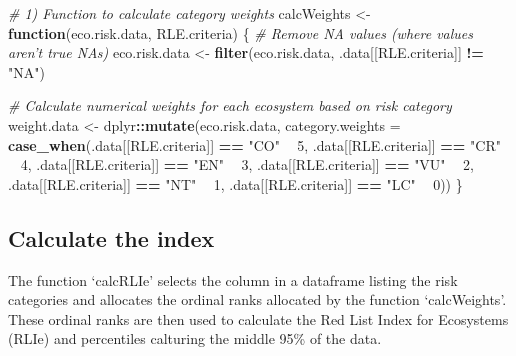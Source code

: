 \documentclass[]{article}
\newenvironment{Shaded}{\begin{snugshade}}{\end{snugshade}}
\newcommand{\KeywordTok}[1]{\textcolor[rgb]{0.13,0.29,0.53}{\textbf{#1}}}
\newcommand{\DataTypeTok}[1]{\textcolor[rgb]{0.13,0.29,0.53}{#1}}
\newcommand{\DecValTok}[1]{\textcolor[rgb]{0.00,0.00,0.81}{#1}}
\newcommand{\StringTok}[1]{\textcolor[rgb]{0.31,0.60,0.02}{#1}}
\newcommand{\CommentTok}[1]{\textcolor[rgb]{0.56,0.35,0.01}{\textit{#1}}}
\newcommand{\ControlFlowTok}[1]{\textcolor[rgb]{0.13,0.29,0.53}{\textbf{#1}}}
\newcommand{\OperatorTok}[1]{\textcolor[rgb]{0.81,0.36,0.00}{\textbf{#1}}}
\newcommand{\NormalTok}[1]{#1}
\begin{document}
\begin{Shaded}
\begin{Highlighting}[]
\CommentTok{# 1) Function to calculate category weights}
\NormalTok{calcWeights <-}\StringTok{ }\ControlFlowTok{function}\NormalTok{(eco.risk.data, RLE.criteria) \{}
  \CommentTok{# Remove NA values (where values aren't true NAs)}
\NormalTok{  eco.risk.data <-}\StringTok{ }\KeywordTok{filter}\NormalTok{(eco.risk.data, .data[[RLE.criteria]] }\OperatorTok{!=}\StringTok{ "NA"}\NormalTok{)}
  
  \CommentTok{# Calculate numerical weights for each ecosystem based on risk category}
\NormalTok{  weight.data <-}\StringTok{ }\NormalTok{dplyr}\OperatorTok{::}\KeywordTok{mutate}\NormalTok{(eco.risk.data, }
                               \DataTypeTok{category.weights =} \KeywordTok{case_when}\NormalTok{(.data[[RLE.criteria]] }\OperatorTok{==}\StringTok{ "CO"} \OperatorTok{~}\StringTok{ }\DecValTok{5}\NormalTok{,}
\NormalTok{                                                            .data[[RLE.criteria]] }\OperatorTok{==}\StringTok{ "CR"} \OperatorTok{~}\StringTok{ }\DecValTok{4}\NormalTok{, }
\NormalTok{                                                            .data[[RLE.criteria]] }\OperatorTok{==}\StringTok{ "EN"} \OperatorTok{~}\StringTok{ }\DecValTok{3}\NormalTok{, }
\NormalTok{                                                            .data[[RLE.criteria]] }\OperatorTok{==}\StringTok{ "VU"} \OperatorTok{~}\StringTok{ }\DecValTok{2}\NormalTok{, }
\NormalTok{                                                            .data[[RLE.criteria]] }\OperatorTok{==}\StringTok{ "NT"} \OperatorTok{~}\StringTok{ }\DecValTok{1}\NormalTok{,}
\NormalTok{                                                            .data[[RLE.criteria]] }\OperatorTok{==}\StringTok{ "LC"} \OperatorTok{~}\StringTok{ }\DecValTok{0}\NormalTok{))}
\NormalTok{\}}
\end{Highlighting}
\end{Shaded}

\subsection{Calculate the index}\label{calculate-the-index}

The function `calcRLIe' selects the column in a dataframe listing the
risk categories and allocates the ordinal ranks allocated by the
function `calcWeights'. These ordinal ranks are then used to calculate
the Red List Index for Ecosystems (RLIe) and percentiles calturing the
middle 95\% of the data.
\end{document}
